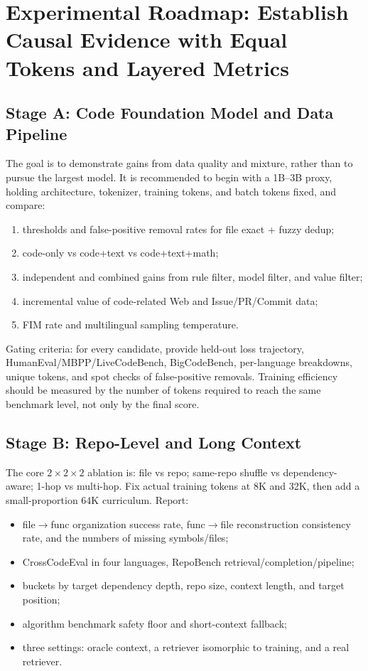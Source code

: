 \documentclass[10pt,a4paper,UTF8,fontset=none]{ctexart}
\begin{document}
\section{Experimental Roadmap: Establish Causal Evidence with Equal Tokens and Layered Metrics}

\subsection{Stage A: Code Foundation Model and Data Pipeline}

The goal is to demonstrate gains from data quality and mixture, rather than to pursue the largest model. It is recommended to begin with a 1B--3B proxy, holding architecture, tokenizer, training tokens, and batch tokens fixed, and compare:

\begin{enumerate}
  \item thresholds and false-positive removal rates for file exact + fuzzy dedup;
  \item code-only vs code+text vs code+text+math;
  \item independent and combined gains from rule filter, model filter, and value filter;
  \item incremental value of code-related Web and Issue/PR/Commit data;
  \item FIM rate and multilingual sampling temperature.
\end{enumerate}

Gating criteria: for every candidate, provide held-out loss trajectory, HumanEval/MBPP/LiveCodeBench, BigCodeBench, per-language breakdowns, unique tokens, and spot checks of false-positive removals. Training efficiency should be measured by the number of tokens required to reach the same benchmark level, not only by the final score.

\subsection{Stage B: Repo-Level and Long Context}

The core $2\times 2\times 2$ ablation is: file vs repo; same-repo shuffle vs dependency-aware; 1-hop vs multi-hop. Fix actual training tokens at 8K and 32K, then add a small-proportion 64K curriculum. Report:

\begin{itemize}
  \item file$\rightarrow$func organization success rate, func$\rightarrow$file reconstruction consistency rate, and the numbers of missing symbols/files;
  \item CrossCodeEval in four languages, RepoBench retrieval/completion/pipeline;
  \item buckets by target dependency depth, repo size, context length, and target position;
  \item algorithm benchmark safety floor and short-context fallback;
  \item three settings: oracle context, a retriever isomorphic to training, and a real retriever.
\end{itemize}
\end{document}
